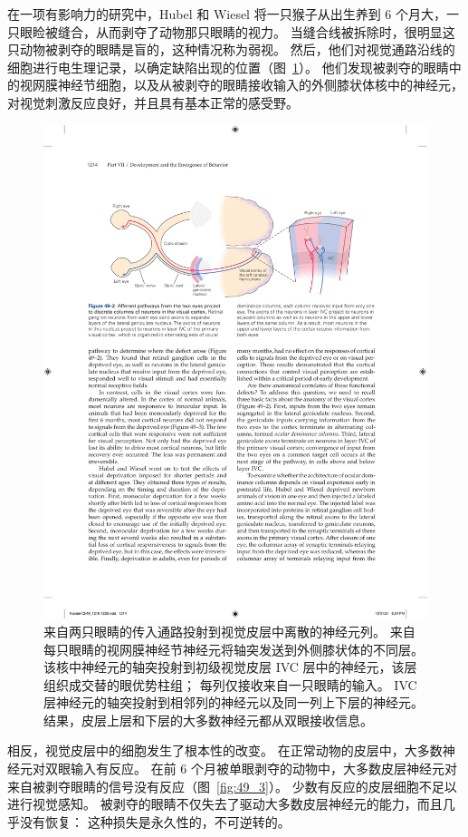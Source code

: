 在一项有影响力的研究中，Hubel 和 Wiesel 将一只猴子从出生养到 6 个月大，一只眼睑被缝合，从而剥夺了动物那只眼睛的视力。
当缝合线被拆除时，很明显这只动物被剥夺的眼睛是盲的，这种情况称为弱视。
然后，他们对视觉通路沿线的细胞进行电生理记录，以确定缺陷出现的位置（图~\ref{fig:49_2}）。
他们发现被剥夺的眼睛中的视网膜神经节细胞，以及从被剥夺的眼睛接收输入的外侧膝状体核中的神经元，对视觉刺激反应良好，并且具有基本正常的感受野。


\begin{figure}[htbp]
	\centering
	\includegraphics[width=0.8\linewidth]{chap49/fig_49_2}
	\caption{来自两只眼睛的传入通路投射到视觉皮层中离散的神经元列。 来自每只眼睛的视网膜神经节神经元将轴突发送到外侧膝状体的不同层。 该核中神经元的轴突投射到初级视觉皮层 IVC 层中的神经元，该层组织成交替的眼优势柱组； 每列仅接收来自一只眼睛的输入。 IVC 层神经元的轴突投射到相邻列的神经元以及同一列上下层的神经元。 结果，皮层上层和下层的大多数神经元都从双眼接收信息。}
	\label{fig:49_2}
\end{figure}


相反，视觉皮层中的细胞发生了根本性的改变。 在正常动物的皮层中，大多数神经元对双眼输入有反应。
在前 6 个月被单眼剥夺的动物中，大多数皮层神经元对来自被剥夺眼睛的信号没有反应（图~\ref{fig:49_3}）。
少数有反应的皮层细胞不足以进行视觉感知。
被剥夺的眼睛不仅失去了驱动大多数皮层神经元的能力，而且几乎没有恢复：
这种损失是永久性的，不可逆转的。


